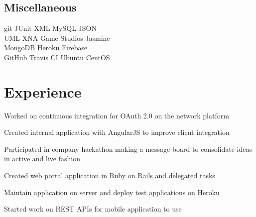 \documentclass[]{deedy-resume-openfont}
\begin{document}
\begin{minipage}[t]{0.33\textwidth}
\subsection{Miscellaneous}
git \textbullet{} JUnit \textbullet{} XML \textbullet{} MySQL \textbullet{} JSON \\ 
UML \textbullet{} XNA Game Studios \textbullet{} Jasmine \\
MongoDB \textbullet{} Heroku \textbullet{} Firebase \\
GitHub \textbullet{} Travis CI \textbullet{} Ubuntu \textbullet{} CentOS
\sectionsep

%
%

\end{minipage} 
\hfill
\begin{minipage}[t]{0.66\textwidth}


\section{Experience}

\vspace{\topsep} %
\begin{tightemize}
\item Worked on continuous integration for OAuth 2.0 on the network platform
\item Created internal application with AngularJS to improve client integration
\item Participated in company hackathon making a message board to consolidate ideas in active and live fashion
\end{tightemize}
\sectionsep

\begin{tightemize}
\item Created web portal application in Ruby on Rails and delegated tasks
\item Maintain application on server and deploy test applications on Heroku
\item Started work on REST APIs for mobile application to use
\end{tightemize}
\sectionsep


\end{minipage}
\end{document}
